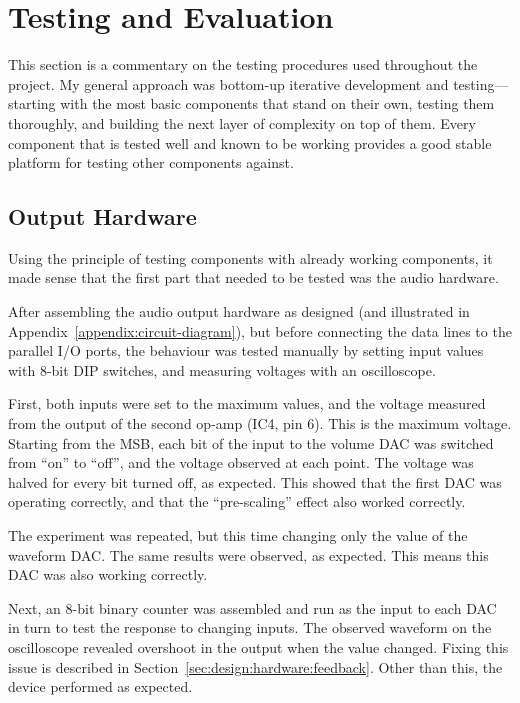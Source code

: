 \chapter{Testing and Evaluation}
\label{sec:testing}

This section is a commentary on the testing procedures used throughout the project.  My general 
approach was bottom-up iterative development and testing---starting with the most basic components 
that stand on their own, testing them thoroughly, and building the next layer of complexity on top 
of them.  Every component that is tested well and known to be working provides a good stable 
platform for testing other components against.

\section{Output Hardware}
\label{sec:testing:hardware}

Using the principle of testing components with already working components, it made sense that the 
first part that needed to be tested was the audio hardware.

After assembling the audio output hardware as designed (and illustrated in 
Appendix~\ref{appendix:circuit-diagram}), but before connecting the data lines to the parallel I/O 
ports, the behaviour was tested manually by setting input values with 8-bit DIP switches, and 
measuring voltages with an oscilloscope.

First, both inputs were set to the maximum values, and the voltage measured from the output of the 
second op-amp (IC4, pin 6).  This is the maximum voltage.  Starting from the MSB, each bit of the 
input to the volume DAC was switched from ``on'' to ``off'', and the voltage observed at each point.  
The voltage was halved for every bit turned off, as expected.  This showed that the first DAC was 
operating correctly, and that the ``pre-scaling'' effect also worked correctly.

The experiment was repeated, but this time changing only the value of the waveform DAC.  The same 
results were observed, as expected.  This means this DAC was also working correctly.

Next, an 8-bit binary counter was assembled and run as the input to each DAC in turn to test the 
response to changing inputs.  The observed waveform on the oscilloscope revealed overshoot in the 
output when the value changed.  Fixing this issue is described in 
Section~\ref{sec:design:hardware:feedback}.  Other than this, the device performed as expected.

